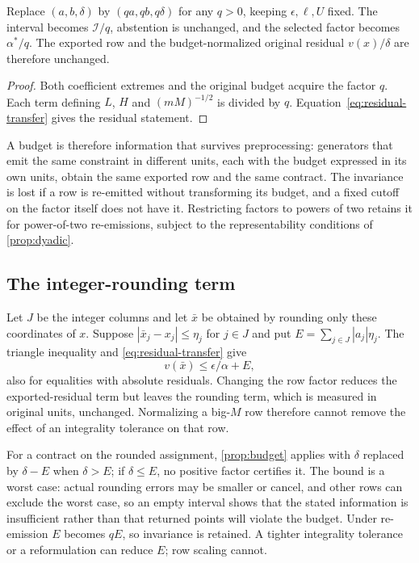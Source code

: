 \begin{corollary}
\label{cor:budget-invariance}
Replace $(a,b,\delta)$ by $(qa,qb,q\delta)$ for any $q>0$, keeping
$\epsilon,\ell,U$ fixed. The interval becomes $\mathcal I/q$, abstention is
unchanged, and the selected factor becomes $\alpha^*/q$. The exported row and the
budget-normalized original residual $v(x)/\delta$ are therefore unchanged.
\end{corollary}
\begin{proof}
Both coefficient extremes and the original budget acquire the factor $q$.
Each term defining $L$, $H$ and $(mM)^{-1/2}$ is divided by $q$.
Equation~\eqref{eq:residual-transfer} gives the residual statement.
\end{proof}

A budget is therefore information that survives preprocessing: generators that emit the same
constraint in different units, each with the budget expressed in its own units, obtain the
same exported row and the same contract. The invariance is lost if a row is re-emitted
without transforming its budget, and a fixed cutoff on the factor itself does not have it.
Restricting factors to powers of two \cite{berthold2021scaling} retains it for power-of-two
re-emissions, subject to the representability conditions of \cref{prop:dyadic}.

\subsection{The integer-rounding term}
Let $J$ be the integer columns and let $\bar x$ be obtained by rounding only these
coordinates of $x$. Suppose $|\bar x_j-x_j|\le\eta_j$ for $j\in J$ and put
$E=\sum_{j\in J}|a_j|\eta_j$. The triangle inequality and \eqref{eq:residual-transfer} give
\begin{equation}\label{eq:rounding-budget}
 v(\bar x)\le \epsilon/\alpha+E,
\end{equation}
also for equalities with absolute residuals. Changing the row factor reduces the
exported-residual term but leaves the rounding term, which is measured in original units,
unchanged. Normalizing a big-$M$ row therefore cannot remove the effect of an integrality
tolerance on that row.

For a contract on the rounded assignment, \cref{prop:budget} applies with $\delta$ replaced by
$\delta-E$ when $\delta>E$; if $\delta\le E$, no positive factor certifies it. The bound is
a worst case: actual rounding errors may be smaller or cancel, and other rows can exclude
the worst case, so an empty interval shows that the stated information is insufficient
rather than that returned points will violate the budget. Under re-emission $E$ becomes $qE$,
so invariance is retained. A tighter integrality tolerance or a reformulation can reduce $E$;
row scaling cannot.

